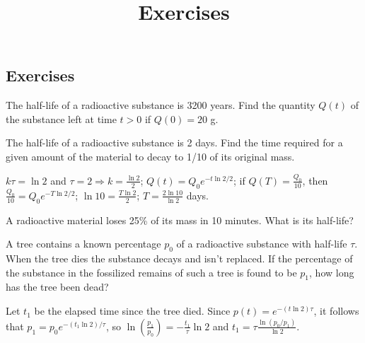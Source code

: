 \documentclass{ximera}
\title{Exercises} \license{CC BY-NC-SA 4.0}
\begin{document}
\begin{abstract}
\end{abstract}
\maketitle

\begin{onlineOnly}
\section*{Exercises}
\end{onlineOnly}
\begin{problem}\label{exer:4.1.1}
The half-life of a radioactive substance is 3200
years.  Find the quantity $Q(t)$ of the substance left at
time $t > 0$ if $Q(0)=20$ g.
\end{problem}

\begin{problem}\label{exer:4.1.2}
The half-life of a radioactive substance is 2 days.  Find
the time required for a given amount of the material to
decay to 1/10 of its original mass.
\begin{solution}
    $k\tau=\ln2$ and $\tau=2\Rightarrow k=\frac{\ln2}{2}$;
$Q(t)=Q_0e^{-t\ln2/2}$; if $Q(T)=\frac{Q_0}{10}$, then
$\frac{Q_0}{10}=Q_0e^{-T\ln2/2}$; $\ln10=\frac{T\ln2}{2}$;
$T=\frac{2\ln10}{\ln2}$ days.
\end{solution}
\end{problem}

\begin{problem}\label{exer:4.1.3}
A radioactive material loses 25\% of its mass
in 10 minutes.  What is its half-life?
\end{problem}

\begin{problem}\label{exer:4.1.4}
A  tree contains a known percentage $p_0$ of
a radioactive substance with half-life $\tau$.  When the
tree dies the substance decays and isn't  replaced.  If the
percentage of the substance in the fossilized remains of
such a tree is found to be $p_1$, how long has the tree been
dead?
\begin{solution}
    Let $t_1$ be the elapsed time since the tree died.
Since $p(t)=e^{-(t\ln2)\tau}$, it follows that
$p_1=p_0e^{-(t_1\ln2)/\tau}$, so $\ln\left(\frac{p_1}{p_0}\right)
=-\frac{t_1}{\tau}\ln2$ and
 $t_1=\tau \frac{\ln(p_0/p_1)}{\ln2}$.
\end{solution}
\end{problem}
\end{document}
